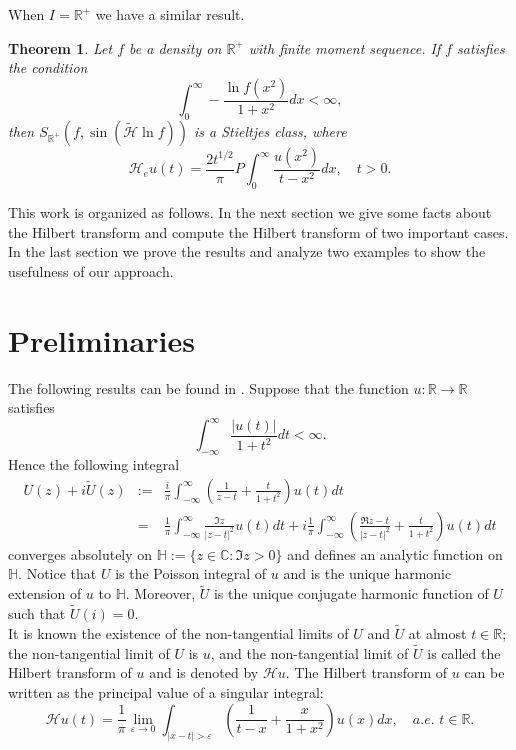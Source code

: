 \documentclass{amsart}
\newtheorem{theorem}{Theorem}
\newcommand{\R}{\mathbb{R}}
\newcommand{\U}{\mathbb{H}}
\newcommand{\INT}{\int_{-\infty}^{\infty}}
\begin{document}
When $I=\R^+$ we have a similar result.
\begin{theorem}\label{sti}
Let $f$ be a density on $\mathbb{R}^+$ with finite moment
sequence. If $f$ satisfies the condition
\begin{equation}\label{parasti}
\int_0^\infty -\frac{\ln f(x^2)}{1+x^2}dx <\infty,
\end{equation}
then $S_{\mathbb{R}^+}( f,\sin (\widetilde {\mathcal{H}}\ln f) ) $ 
is a Stieltjes class, where
$$\mathcal{H}_eu(t)=\frac{2t^{1/2}}{\pi}P \int_0^\infty \frac{u(x^2)}{t-x^2}dx,\quad t>0.$$
\end{theorem}

This work is organized as follows. In the next section we give some facts about the Hilbert transform and compute the Hilbert transform of two important cases. In the last section we prove the results and analyze two examples to show the usefulness of our approach.

\section{Preliminaries}\label{pre}
The following results can be found in \cite[pages 60-65]{Koosis}. Suppose that the function $u:\R \rightarrow \R$ satisfies
\begin{equation}\label{krein}
\int_{-\infty}^{\infty}\frac{|u(t)|}{1+t^2}dt < \infty.
\end{equation}
Hence the following integral
\begin{eqnarray*}
U(z)+i\widetilde{U}(z)&:=&\frac{i}{\pi} \int_{-\infty}^{\infty} \left(\frac{1}{z-t} +\frac{t}{1+t^2}\right)u(t)dt\\
               &=&\frac{1}{\pi} \INT \frac{\Im z}{|z-t|^2}u(t)dt+i\frac{1}{\pi}\INT \left(\frac{\Re z-t}{|z-t|^2}+ \frac{t}{1+t^2}  \right)u(t)dt
\end{eqnarray*}
converges absolutely on $\mathbb{H}:=\{z\in \mathbb{C}: \Im z>0\}$ and defines an analytic function on $\U$. Notice that $U$ is the Poisson integral of $u$ and is the unique harmonic extension of $u$ to $\U$. Moreover, $\widetilde{U}$ is the unique conjugate harmonic function of $U$ such that $\widetilde{U}(i)=0$.\\

It is known the existence of the non-tangential limits of $U$ and $\widetilde{U}$ at almost $t\in \R$; the non-tangential limit of $U$ is $u$, and the non-tangential limit of $\widetilde{U}$ is called the Hilbert transform of $u$ and is denoted by $\mathcal{H}u$. The Hilbert transform of $u$ can be written as the principal value of a singular integral:
\begin{equation*}
\mathcal{H}u(t)=\frac{1}{\pi}  \lim_{\varepsilon \rightarrow 0}\int_{|x-t|>\varepsilon}\left(\frac{1}{t-x}+\frac{x}{1+x^2} \right)u(x)dx, \quad a.e. \,\, t\in \R. 
\end{equation*}
\end{document}
